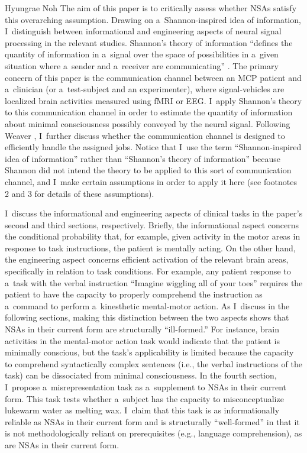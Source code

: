 \begin{artengenv}{Hyungrae Noh}
The aim of this paper is to critically assess whether NSAs satisfy this overarching assumption. Drawing on a~Shannon-inspired idea of information, I~distinguish between informational and engineering aspects of neural signal processing in the relevant studies. Shannon's
\parencite*[][]{shannon_mathematical_1948} %
 theory of information ``defines the quantity of information in a~signal over the space of possibilities in a~given situation where a~sender and a~receiver are communicating'' 
\parencite[][p.179]{noh_no-report_2018}. %
 The primary concern of this paper is the communication channel between an MCP patient and a~clinician (or a~test-subject and an experimenter), where signal-vehicles are localized brain activities measured using fMRI or EEG. I~apply Shannon's theory to this communication channel in order to estimate the quantity of information about minimal consciousness possibly conveyed by the neural signal. Following Weaver 
\parencite*[][p.270]{weaver_recent_1953}, %
 I~further discuss whether the communication channel is designed to efficiently handle the assigned jobs. Notice that I~use the term ``Shannon-inspired idea of information'' rather than ``Shannon's theory of information'' because Shannon did not intend the theory to be applied to this sort of communication channel, and I~make certain assumptions in order to apply it here (see footnotes 2 and 3 for details of these assumptions).

I~discuss the informational and engineering aspects of clinical tasks in the paper's second and third sections, respectively. Briefly, the informational aspect concerns the conditional probability that, for example, given activity in the motor areas in response to task instructions, the patient is mentally acting. On the other hand, the engineering aspect concerns efficient activation of the relevant brain areas, specifically in relation to task conditions. For example, any patient response to a~task with the verbal instruction ``Imagine wiggling all of your toes'' requires the patient to have the capacity to properly comprehend the instruction as a~command to perform a~kinesthetic mental-motor action. As I~discuss in the following sections, making this distinction between the two aspects shows that NSAs in their current form are structurally ``ill-formed.'' For instance, brain activities in the mental-motor action task would indicate that the patient is minimally conscious, but the task's applicability is limited because the capacity to comprehend syntactically complex sentences (i.e., the verbal instructions of the task) can be dissociated from minimal consciousness. In the fourth section, I~propose a~misrepresentation task as a~supplement to NSAs in their current form. This task tests whether a~subject has the capacity to misconceptualize lukewarm water as melting wax. I~claim that this task is as informationally reliable as NSAs in their current form and is structurally ``well-formed'' in that it is not methodologically reliant on prerequisites (e.g., language comprehension), as are NSAs in their current form.


\end{artengenv}
